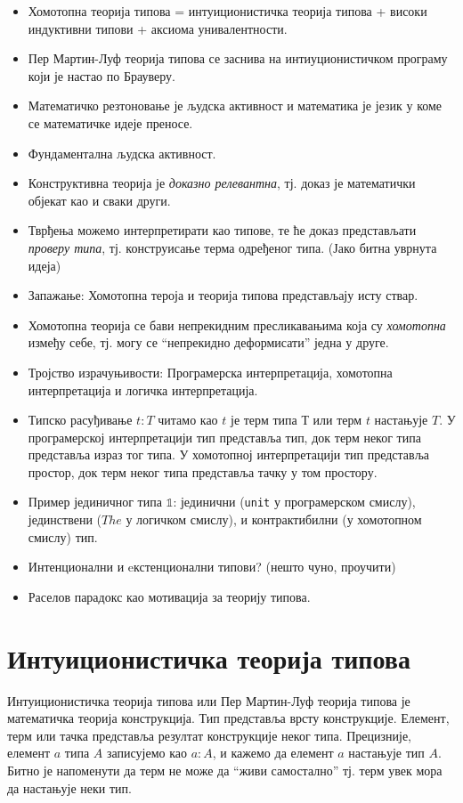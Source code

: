 \documentclass[12pt,oneside]{memoir}
\begin{document}
\begin{itemize}
    \item{Хомотопна теорија типова = интуиционистичка теорија типова + високи индуктивни типови + аксиома унивалентности.}
    \item{Пер Мартин-Луф теорија типова се заснива на интиуционистичком програму који је настао по Брауверу.}
    \item{Математичко резтоновање је људска активност и математика је језик у коме се математичке идеје преносе.}
    \item{Фундаментална људска активност.}
    \item{Конструктивна теорија је \textit{доказно релевантна}, тј. доказ је математички објекат као и сваки други.}
    \item{Тврђења можемо интерпретирати као типове, те ће доказ представљати \textit{проверу типа}, тј. конструисање терма одређеног типа. (Јако битна уврнута идеја)}
    \item{Запажање: Хомотопна тероја и теорија типова представљају исту ствар.}
    \item{Хомотопна теорија се бави непрекидним пресликавањима која су \textit{хомотопна} између себе, тј. могу се ``непрекидно деформисати'' једна у друге.}
    \item{Тројство израчуњивости: Програмерска интерпретација, хомотопна интерпретација и логичка интерпретација.}
    \item{Типско расуђивање $t : T$ читамо као $t$ је терм типа $Т$ или терм $t$ настањује $T$. У програмерској интерпретацији тип представља тип, док терм неког типа представља израз тог типа. У хомотопној интерпретацији тип представља простор, док терм неког типа представља тачку у том простору.}
    \item{Пример јединичног типа $\mathbb{1}$: јединични (\texttt{unit} у програмерском смислу), јединствени ($The$ у логичком смислу), и контрактибилни (у хомотопном смислу) тип.}
    \item{Интенционални и eкстенционални типови? (нешто чуно, проучити)}
    \item{Раселов парадокс као мотивација за теорију типова.}
\end{itemize}

\section{Интуиционистичка теорија типова}

Интуиционистичка теорија типова или Пер Мартин-Луф теорија типова је математичка теорија конструкција. Тип представља врсту конструкције. Елемент, терм или тачка представља резултат конструкције неког типа. Прецизније, елемент $a$ типа $A$ записујемо као $a : A$, и кажемо да елемент $a$ настањује тип $A$. Битно је напоменути да терм не може да ``живи самостално'' тј. терм увек мора да настањује неки тип. 
\end{document}
